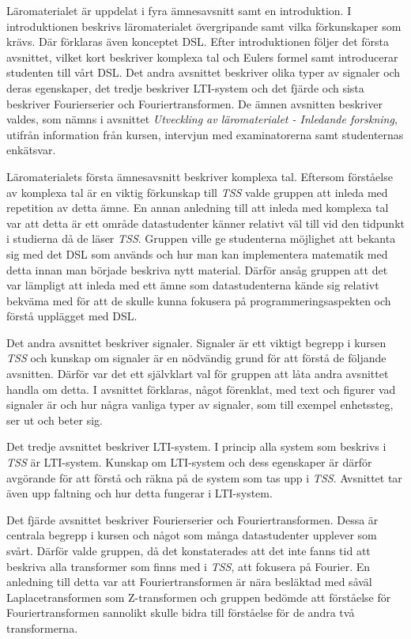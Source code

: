 \documentclass[]{article}
\begin{document}
Läromaterialet är uppdelat i fyra ämnesavsnitt samt en introduktion. I introduktionen beskrivs läromaterialet
övergripande samt vilka förkunskaper som krävs. Där förklaras även konceptet DSL. Efter introduktionen följer det
första avsnittet, vilket kort beskriver komplexa tal och Eulers formel samt introducerar studenten till vårt DSL. Det
andra avsnittet beskriver olika typer av signaler och deras egenskaper, det tredje beskriver LTI-system och det fjärde
och sista beskriver Fourierserier och Fouriertransformen. De ämnen avsnitten beskriver valdes, som nämns i avsnittet
\textit{Utveckling av läromaterialet - Inledande forskning}, utifrån information från kursen, intervjun med
examinatorerna samt studenternas enkätsvar. 

Läromaterialets första ämnesavsnitt beskriver komplexa tal. Eftersom förståelse av komplexa tal är en viktig förkunskap
till \textit{TSS} valde gruppen att inleda med repetition av detta ämne. En annan anledning till att inleda med komplexa
tal var att detta är ett område datastudenter känner relativt väl till vid den tidpunkt i studierna då de läser
\textit{TSS}. Gruppen ville ge studenterna möjlighet att bekanta sig med det DSL som används och hur man kan
implementera matematik med detta innan man började beskriva nytt material. Därför ansåg gruppen att det var lämpligt att
inleda med ett ämne som datastudenterna kände sig relativt bekväma med för att de skulle kunna fokusera på
programmeringsaspekten och förstå upplägget med DSL.

Det andra avsnittet beskriver signaler. Signaler är ett viktigt begrepp i kursen \textit{TSS} och kunskap om signaler är
en nödvändig grund för att förstå de följande avsnitten. Därför var det ett självklart val för gruppen att låta andra
avsnittet handla om detta. I avsnittet förklaras, något förenklat, med text och figurer vad signaler är och hur några
vanliga typer av signaler, som till exempel enhetssteg, ser ut och beter sig.

Det tredje avsnittet beskriver LTI-system. I princip alla system som beskrivs i \textit{TSS} är LTI-system. Kunskap om LTI-system
och dess egenskaper är därför avgörande för att förstå och räkna på de system som tas upp i \textit{TSS}. Avsnittet tar
även upp faltning och hur detta fungerar i LTI-system.

Det fjärde avsnittet beskriver Fourierserier och Fouriertransformen. Dessa är centrala begrepp i kursen och något som
många datastudenter upplever som svårt. Därför valde gruppen, då det konstaterades att det inte fanns tid att beskriva
alla transformer som finns med i \textit{TSS}, att fokusera på Fourier. En anledning till detta var att Fouriertransformen är nära besläktad med
såväl Laplacetransformen som Z-transformen och gruppen bedömde att förståelse för Fouriertransformen sannolikt skulle
bidra till förståelse för de andra två transformerna.
\end{document}
